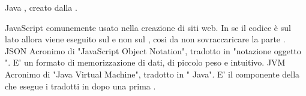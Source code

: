 \elemento
{Java} 
{, creato dalla .}

\elemento
{JavaScript} 
{ comunemente usato nella creazione di {siti web}. In  se il codice  è sul lato  allora viene eseguito sul  e non sul , cosi da non sovraccaricare la parte .}
\elemento
{JSON} 
{Acronimo di "JavaScript Object Notation", tradotto in "notazione oggetto ". E' un formato di memorizzazione di dati, di piccolo peso e intuitivo.}
\elemento
{JVM}
{Acronimo di "Java Virtual Machine", tradotto in " Java". E' il componente della  che esegue i  tradotti in  dopo una prima .}

